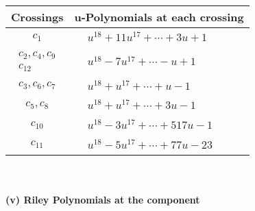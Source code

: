 \documentclass[1p]{elsarticle_modified}
\theoremstyle{definition}
\begin{document}
\begin{tabular}{m{50pt}|m{274pt}}
Crossings & \hspace{64pt}u-Polynomials at each crossing \\
\hline $$\begin{aligned}c_{1}\end{aligned}$$&$\begin{aligned}
&u^{18}+11 u^{17}+\cdots+3 u+1
\end{aligned}$\\
\hline $$\begin{aligned}c_{2},c_{4},c_{9}\\c_{12}\end{aligned}$$&$\begin{aligned}
&u^{18}-7 u^{17}+\cdots- u+1
\end{aligned}$\\
\hline $$\begin{aligned}c_{3},c_{6},c_{7}\end{aligned}$$&$\begin{aligned}
&u^{18}+u^{17}+\cdots+u-1
\end{aligned}$\\
\hline $$\begin{aligned}c_{5},c_{8}\end{aligned}$$&$\begin{aligned}
&u^{18}+u^{17}+\cdots+3 u-1
\end{aligned}$\\
\hline $$\begin{aligned}c_{10}\end{aligned}$$&$\begin{aligned}
&u^{18}-3 u^{17}+\cdots+517 u-1
\end{aligned}$\\
\hline $$\begin{aligned}c_{11}\end{aligned}$$&$\begin{aligned}
&u^{18}-5 u^{17}+\cdots+77 u-23
\end{aligned}$\\
\hline
\end{tabular}\\~\\
\newpage\renewcommand{\arraystretch}{1}
\flushleft \textbf{(v) Riley Polynomials at the component}\newline \\
\end{document}
